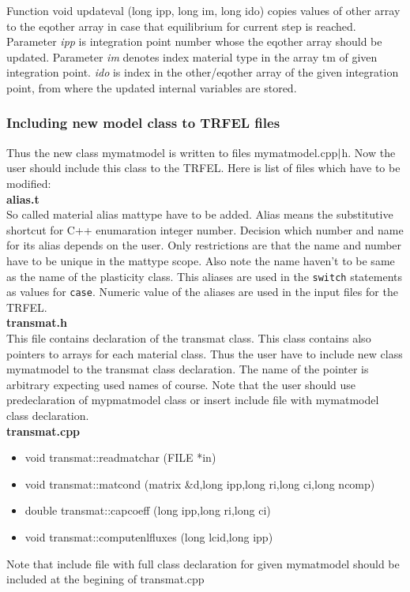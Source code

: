 Function {\sf void updateval (long ipp, long im, long ido)} copies values of {\sf other} array to
the eqother array in case that equilibrium for current step is reached. Parameter {\it ipp} is
integration point number whose the {\sf eqother} array should be updated. Parameter {\it im} denotes
index material type in the array {\sf tm} of given integration point. {\it ido} is index in the
{\sf other/eqother} array of the given integration point, from where the updated internal variables are stored.


\subsubsection {Including new model class to TRFEL files}
Thus the new class {\sf mymatmodel} is written to files  mymatmodel.cpp${\rm |}$h. Now the user should
include this class to the TRFEL. Here is list of files which have to be modified:\\

{\bf alias.t}\\
So called material alias {\sf mattype} have to be added. Alias means the substitutive shortcut
for C++ enumaration integer number. Decision which number and name for its alias depends on the user.
Only restrictions are that the name and number have to be unique in the {\sf mattype} scope. Also note
the name haven't to be same as the name of the plasticity class. This aliases are used in the
{\tt switch} statements as values for {\tt case}. Numeric value of the aliases are used in the input
files for the TRFEL.\\

{\bf transmat.h}\\
This file contains declaration of the {\sf transmat} class. This class contains also pointers to arrays for each
material class. Thus the user have to include new class {\sf mymatmodel} to the {\sf transmat} class declaration.
The name of the pointer is arbitrary expecting used names of course. Note that the user should use predeclaration
of {\sf mypmatmodel} class or insert include file with {\sf mymatmodel} class declaration.\\

{\bf transmat.cpp}\\
\begin{itemize}
\item {\sf void transmat::readmatchar (FILE *in)}
\item {\sf void transmat::matcond (matrix \&d,long ipp,long ri,long ci,long ncomp)}
\item {\sf double transmat::capcoeff (long ipp,long ri,long ci)}
\item {\sf void transmat::computenlfluxes (long lcid,long ipp)}
\end{itemize}
Note that include file with full class declaration for given {\sf mymatmodel} should be included at the begining
of transmat.cpp\\


